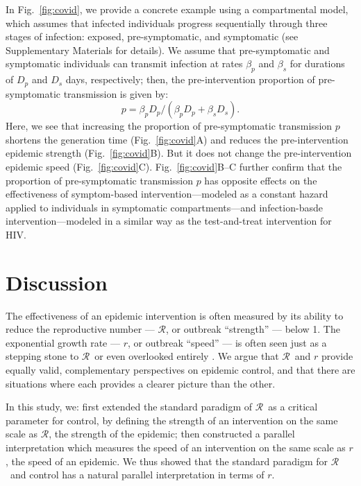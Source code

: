 \documentclass[12pt]{article}
\newcommand{\RR}{\ensuremath{{\mathcal R}}}
\newcommand{\figref}[1]{Fig.~\ref{fig:#1}}
\begin{document}
In \figref{covid}, we provide a concrete example using a compartmental model, which assumes that infected individuals progress sequentially through three stages of infection: exposed, pre-symptomatic, and symptomatic (see Supplementary Materials for details).
We assume that pre-symptomatic and symptomatic individuals can transmit infection at rates $\beta_p$ and $\beta_s$ for durations of $D_p$ and $D_s$ days, respectively;
then, the pre-intervention proportion of pre-symptomatic transmission is given by:
\begin{equation}
p=\beta_p D_p/(\beta_p D_p + \beta_s  D_s).
\end{equation}
Here, we see that increasing the proportion of pre-symptomatic transmission $p$ shortens the generation time (\figref{covid}A) and reduces the pre-intervention epidemic strength (\figref{covid}B). But it does not change the pre-intervention epidemic speed (\figref{covid}C).
\figref{covid}B--C further confirm that the proportion of pre-symptomatic transmission $p$ has opposite effects on the effectiveness of symptom-based intervention---modeled as a constant hazard applied to individuals in symptomatic compartments---and infection-basde intervention---modeled in a similar way as the test-and-treat intervention for HIV.

\section{Discussion}

The effectiveness of an epidemic intervention is often measured by its ability to reduce the reproductive number --- \RR, or outbreak ``strength'' --- below 1. The exponential growth rate --- $r$, or outbreak ``speed'' --- is often seen just as a stepping stone to \RR\, or even overlooked entirely \citep{park2020reconciling}.
We argue that \RR\ and $r$ provide equally valid, complementary perspectives on epidemic control, and that there are situations where each provides a clearer picture than the other.

In this study, we:
first extended the standard paradigm of \RR\ as a critical parameter for control, by defining the strength of an intervention on the same scale as \RR, the strength of the epidemic; 
then constructed a parallel interpretation which measures the speed of an intervention on the same scale as $r$, the speed of an epidemic.
We thus showed that the standard paradigm for \RR\ and control has a natural parallel interpretation in terms of $r$.
\end{document}
